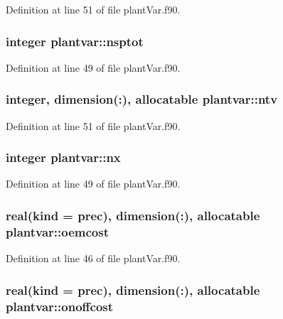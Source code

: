 Definition at line 51 of file plant\-Var.\-f90.

\hypertarget{classplantvar_a1301bcb36aec6c118be8c084932de099}{
\subsubsection[{nsptot}]{\setlength{\rightskip}{0pt plus 5cm}integer plantvar\-::nsptot}}\label{classplantvar_a1301bcb36aec6c118be8c084932de099}


Definition at line 49 of file plant\-Var.\-f90.

\hypertarget{classplantvar_a019098844671b06b71ae0b76aa3d4fa8}{
\subsubsection[{ntv}]{\setlength{\rightskip}{0pt plus 5cm}integer, dimension(\-:), allocatable plantvar\-::ntv}}\label{classplantvar_a019098844671b06b71ae0b76aa3d4fa8}


Definition at line 51 of file plant\-Var.\-f90.

\hypertarget{classplantvar_ac08eaef488f61f2e228ce9b823a3d1ab}{
\subsubsection[{nx}]{\setlength{\rightskip}{0pt plus 5cm}integer plantvar\-::nx}}\label{classplantvar_ac08eaef488f61f2e228ce9b823a3d1ab}


Definition at line 49 of file plant\-Var.\-f90.

\hypertarget{classplantvar_a70a5a58ce085d08a2b8fb1434ab5862c}{
\subsubsection[{oemcost}]{\setlength{\rightskip}{0pt plus 5cm}real(kind = prec), dimension(\-:), allocatable plantvar\-::oemcost}}\label{classplantvar_a70a5a58ce085d08a2b8fb1434ab5862c}


Definition at line 46 of file plant\-Var.\-f90.

\hypertarget{classplantvar_a2e95a86439f2372f77360c8ba1efaaff}{
\subsubsection[{onoffcost}]{\setlength{\rightskip}{0pt plus 5cm}real(kind = prec), dimension(\-:), allocatable plantvar\-::onoffcost}}\label{classplantvar_a2e95a86439f2372f77360c8ba1efaaff}


